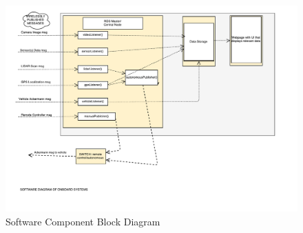 \begin{figure}[H]
\centering
\includegraphics[scale=0.45]{Software_Component_Diagram}
\caption{Software Component Block Diagram}
\label{fig:softwarecomponentdiagram}
\end{figure}

